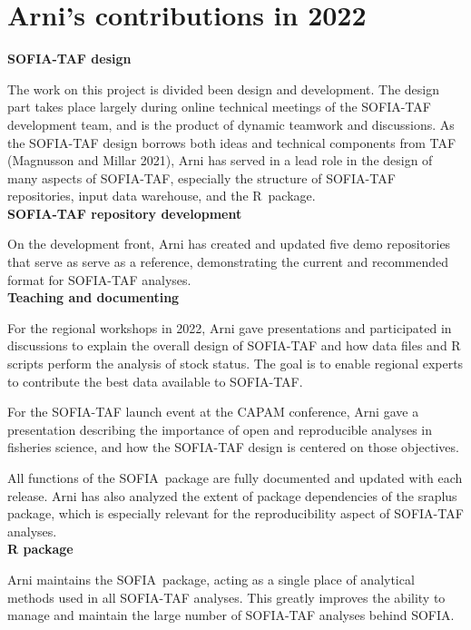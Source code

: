 \documentclass[12pt]{article}
\newcommand\SOFIA{{\sf SOFIA}}
\begin{document}
\normalsize

\newpage

\appendix

\section{Arni's contributions in 2022}

\textbf{SOFIA-TAF design}

The work on this project is divided been design and development. The design part
takes place largely during online technical meetings of the SOFIA-TAF
development team, and is the product of dynamic teamwork and discussions. As the
SOFIA-TAF design borrows both ideas and technical components from TAF (Magnusson
and Millar 2021), Arni has served in a lead role in the design of many aspects
of SOFIA-TAF, especially the structure of SOFIA-TAF repositories, input data
warehouse, and the
R~package.\\[-2ex]

\textbf{SOFIA-TAF repository development}

On the development front, Arni has created and updated five demo repositories
that serve as serve as a reference, demonstrating the current and
recommended format for SOFIA-TAF analyses.\\[-2ex]

\textbf{Teaching and documenting}

For the regional workshops in 2022, Arni gave presentations and participated in
discussions to explain the overall design of SOFIA-TAF and how data files and R
scripts perform the analysis of stock status. The goal is to enable regional
experts to contribute the best data available to SOFIA-TAF.

For the SOFIA-TAF launch event at the CAPAM conference, Arni gave a presentation
describing the importance of open and reproducible analyses in fisheries
science, and how the SOFIA-TAF design is centered on those objectives.

All functions of the \SOFIA\ package are fully documented and updated with each
release. Arni has also analyzed the extent of package dependencies of the {\sf
  sraplus} package, which is especially relevant for the reproducibility aspect
of SOFIA-TAF analyses.\\[-2ex]

\textbf{R package}

Arni maintains the \SOFIA\ package, acting as a single place of analytical
methods used in all SOFIA-TAF analyses. This greatly improves the ability to
manage and maintain the large number of SOFIA-TAF analyses behind SOFIA.\\[-2ex]
\end{document}
